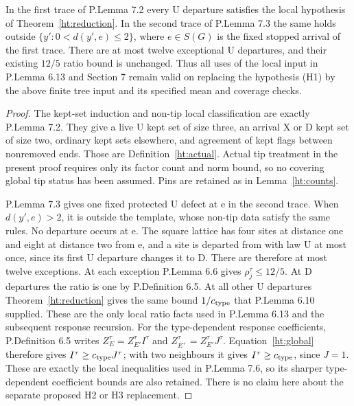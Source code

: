 \begin{htprop}\label{ht:use}
In the first trace of P.Lemma 7.2 every U departure satisfies the local
hypothesis of Theorem~\ref{ht:reduction}. In the second trace of
P.Lemma 7.3 the same holds outside
\(\{y':0<d(y',e)\le2\}\), where \(e\in S(G)\) is the fixed stopped
arrival of the first trace. There are at most twelve exceptional U
departures, and their existing \(12/5\) ratio bound is unchanged.
Thus all uses of the local input in P.Lemma 6.13 and Section 7 remain
valid on replacing the hypothesis (H1) by the above finite tree input
and its specified mean and coverage checks.
\end{htprop}
\begin{proof}
The kept-set induction and non-tip local classification are exactly
P.Lemma 7.2. They give a live U kept set of size three, an arrival X
or D kept set of size two, ordinary kept sets elsewhere, and agreement
of kept flags between nonremoved ends. Those are
Definition~\ref{ht:actual}. Actual tip treatment in the present proof
requires only its factor count and norm bound, so no covering global
tip status has been assumed. Pins are retained as in
Lemma~\ref{ht:counts}.

P.Lemma 7.3 gives one fixed protected U defect at e in the second trace.
When \(d(y',e)>2\), it is outside the template, whose non-tip data
satisfy the same rules. No departure occurs at e. The square lattice
has four sites at distance one and eight at distance two from e, and
a site is departed from with law U at most once, since its first U
departure changes it to D. There are therefore at most twelve exceptions.
At each exception P.Lemma 6.6 gives \(\rho_j^\tau\le12/5\).
At D departures the ratio is one by P.Definition 6.5. At all other U
departures Theorem~\ref{ht:reduction} gives the same bound
\(1/c_{\rm type}\) that P.Lemma 6.10 supplied. These are the only local
ratio facts used in P.Lemma 6.13 and the subsequent response recursion.
For the type-dependent response coefficients, P.Definition 6.5 writes
\(Z_E^\tau=Z_{E'}^\tau I^\tau\) and
\(Z_{E^+}^\tau=Z_{E'}^\tau J^\tau\).
Equation~\eqref{ht:global} therefore gives
\(I^\tau\ge c_{\rm type}J^\tau\); with two neighbours it gives
\(I^\tau\ge c_{\rm type}\), since \(J=1\).
These are exactly the local inequalities used in P.Lemma 7.6, so its
sharper type-dependent coefficient bounds are also retained.
There is no claim here about the separate proposed H2 or H3 replacement.
\end{proof}

